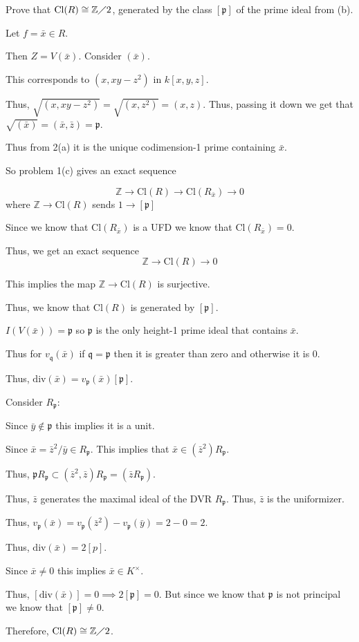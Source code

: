 \documentclass[12pt, letterpaper]{article}
\newcommand{\Z}{\mathbb{Z}}
\newcommand{\p}{\mathfrak{p}}
\newcommand{\mf}[1]{\mathfrak{#1}}
\begin{document}
\begin{subproblem}{}
    Prove that $\mathrm{Cl}(R) \cong \Z \diagup 2$, generated by the class $[\p]$ of the prime ideal from (b).
\end{subproblem}
\begin{problemproof}
    Let $f = \bar{x} \in R$.

    Then $Z=V(\bar{x})$. Consider $(\bar{x})$.

    This corresponds to $(x,xy-z^2)$ in $k[x,y,z]$.

    Thus, $\sqrt{(x,xy-z^2)}=\sqrt{(x,z^2)}=(x,z)$. Thus, passing it down we get that $\sqrt{(\bar{x})}=(\bar{x},\bar{z})=\p$.

    Thus from 2(a) it is the unique codimension-1 prime containing $\bar{x}$.

    So problem 1(c) gives an exact sequence

    \[\Z \to \mathrm{Cl}(R) \to \mathrm{Cl}(R_{\bar{x}}) \to 0\]
    where $\Z \to \mathrm{Cl}(R)$ sends $1 \to [\p]$

    Since we know that $\mathrm{Cl}(R_{\bar{x}})$ is a UFD we know that $\mathrm{Cl}(R_{\bar{x}})=0$.

    Thus, we get an exact sequence 
    \[\Z \to \mathrm{Cl}(R) \to 0\]

    This implies the map $\Z \to \mathrm{Cl}(R)$ is surjective.

    Thus, we know that $\mathrm{Cl}(R)$ is generated by $[\p]$.

    $I(V(\bar{x}))=\p$ so $\p$ is the only height-1 prime ideal that contains $\bar{x}$.

    Thus for $v_\mf{q}(\bar{x})$ if $\mf{q}=\p$ then it is greater than zero and otherwise it is 0.

    Thus, $\mathrm{div}(\bar{x})=v_\p(\bar{x})[\p]$.

    Consider $R_\p$:

    Since $\bar{y} \notin \p$ this implies it is a unit.

    Since $\bar{x}=\bar{z}^2 / \bar{y} \in R_\p$. This implies that $\bar{x} \in (\bar{z}^2)R_\p$.

    Thus, $\p R_\p \subset (\bar{z}^2,\bar{z})R_\p=(\bar{z}R_\p)$.

    Thus, $\bar{z}$ generates the maximal ideal of the DVR $R_\p$. Thus, $\bar{z}$ is the uniformizer.

    Thus, $v_\p(\bar{x})=v_\p(\bar{z}^2)-v_\p(\bar{y})=2-0=2$.

    Thus, $\mathrm{div}(\bar{x})=2[p]$.

    Since $\bar{x} \neq 0$ this implies $\bar{x} \in K^\times$.

    Thus, $[\mathrm{div}(\bar{x})]=0 \implies 2[\p] = 0$. But since we know that $\p$ is not principal we know that $[\p] \neq 0$.

    Therefore, $\mathrm{Cl}(R) \cong \Z \diagup 2$.
\end{problemproof}
\end{document}
